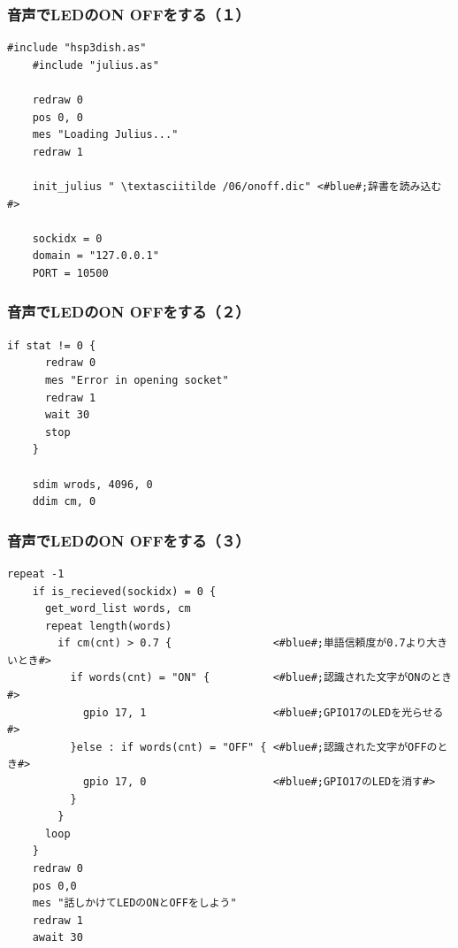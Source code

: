 \documentclass[14pt]{beamer}
\begin{document}
\begin{frame}[fragile]
  \frametitle{音声でLEDのON OFFをする（１）}
  \begin{lstlisting}[caption=ledvoice.hsp,label=ledvoice.hsp]
    #include "hsp3dish.as"
    #include "julius.as"

    redraw 0
    pos 0, 0
    mes "Loading Julius..."
    redraw 1

    init_julius " \textasciitilde /06/onoff.dic" <#blue#;辞書を読み込む#>

    sockidx = 0
    domain = "127.0.0.1"
    PORT = 10500
  \end{lstlisting}
\end{frame}

\begin{frame}[fragile]
  \frametitle{音声でLEDのON OFFをする（２）}
  \begin{lstlisting}[caption=ledvoice.hsp,label=ledvoice.hsp]
    if stat != 0 {
      redraw 0
      mes "Error in opening socket"
      redraw 1
      wait 30
      stop
    }

    sdim wrods, 4096, 0
    ddim cm, 0
  \end{lstlisting}
\end{frame}

\begin{frame}[fragile]
  \frametitle{音声でLEDのON OFFをする（３）}
  \begin{lstlisting}[caption=ledvoice.hsp,label=ledvoice.hsp,basicstyle=\scriptsize]
    repeat -1
    if is_recieved(sockidx) = 0 {
      get_word_list words, cm
      repeat length(words)
        if cm(cnt) > 0.7 {                <#blue#;単語信頼度が0.7より大きいとき#>
          if words(cnt) = "ON" {          <#blue#;認識された文字がONのとき#>
            gpio 17, 1                    <#blue#;GPIO17のLEDを光らせる#>
          }else : if words(cnt) = "OFF" { <#blue#;認識された文字がOFFのとき#>
            gpio 17, 0                    <#blue#;GPIO17のLEDを消す#>
          }
        }
      loop
    }
    redraw 0
    pos 0,0
    mes "話しかけてLEDのONとOFFをしよう"
    redraw 1
    await 30
  \end{lstlisting}
\end{frame}
\end{document}
